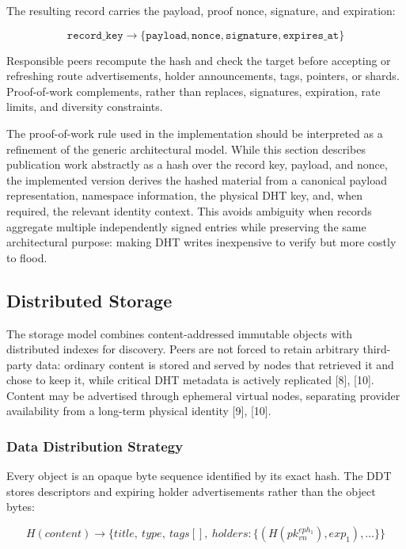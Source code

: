 \documentclass[12pt]{article}
\begin{document}
The resulting record carries the payload, proof nonce, signature, and expiration:

\[
\texttt{record\_key} \rightarrow
\{
\texttt{payload},
\texttt{nonce},
\texttt{signature},
\texttt{expires\_at}
\}
\]

Responsible peers recompute the hash and check the target before accepting or
refreshing route advertisements, holder announcements, tags, pointers, or shards.
Proof-of-work complements, rather than replaces, signatures, expiration, rate
limits, and diversity constraints.

The proof-of-work rule used in the implementation should be interpreted as a refinement of the generic architectural model. While this section describes publication work abstractly as a hash over the record key, payload, and nonce, the implemented version derives the hashed material from a canonical payload representation, namespace information, the physical DHT key, and, when required, the relevant identity context. This avoids ambiguity when records aggregate multiple independently signed entries while preserving the same architectural purpose: making DHT writes inexpensive to verify but more costly to flood.






\subsection{Distributed Storage}

The storage model combines content-addressed immutable objects with distributed
indexes for discovery. Peers are not forced to retain arbitrary third-party data:
ordinary content is stored and served by nodes that retrieved it and chose to keep
it, while critical DHT metadata is actively replicated [8], [10]. Content may be
advertised through ephemeral virtual nodes, separating provider availability from a
long-term physical identity [9], [10].

\subsubsection{Data Distribution Strategy}

Every object is an opaque byte sequence identified by its exact hash. The DDT stores
descriptors and expiring holder advertisements rather than the object bytes:

\[
H(content) \rightarrow \{title,\ type,\ tags[],\
holders:\{(H(pk_{vn}^{eph_1}),exp_1),\ldots\}\}
\]
\end{document}

